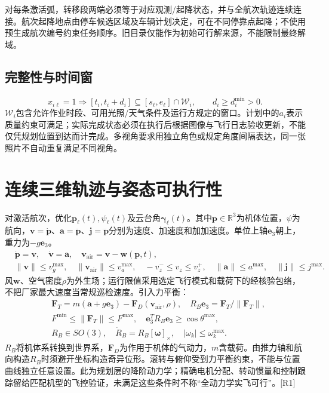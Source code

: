 \noindent 对每条激活弧，转移段两端必须等于对应观测/起降状态，并与全航次轨迹连续连接。航次起降地点由停车候选区域及车辆计划决定，可在不同停靠点起降；不使用预生成航次编号约束任务顺序。旧目录仅能作为初始可行解来源，不能限制最终解域。

\subsection{完整性与时间窗}
\begin{equation}
 x_{i\ell}=1\Rightarrow
 [t_i,t_i+d_i]\subseteq[s_\ell,e_\ell]\cap\mathcal W_i,
 \qquad d_i\ge d_i^{\min}>0.\label{eng:eq:window}
\end{equation}
\noindent $\mathcal W_i$包含允许作业时段、可用光照/天气条件及运行方规定的窗口。计划中的$a_i$表示质量约束可满足；实际完成状态必须在执行后根据图像与飞行日志验收更新，不能仅凭规划位置到达而计完成。多视角要求用独立角色或规定角度间隔表达，同一张照片不自动重复满足不同视角。
\clearpage

\section{连续三维轨迹与姿态可执行性}
\noindent 对激活航次，优化$\mathbf p_\ell(t),\psi_\ell(t)$及云台角$\boldsymbol\gamma_\ell(t)$。其中$\mathbf p\in\mathbb R^3$为机体位置，$\psi$为航向，$\mathbf v=\dot{\mathbf p}$、$\mathbf a=\ddot{\mathbf p}$、$\mathbf j=\dddot{\mathbf p}$分别为速度、加速度和加加速度。单位上轴$\mathbf e_3$朝上，重力为$-g\mathbf e_3$。
\begin{align}
 &\dot{\mathbf p}=\mathbf v,\quad \dot{\mathbf v}=\mathbf a,\quad
 \mathbf v_{\mathrm{air}}=\mathbf v-\mathbf w(\mathbf p,t),\\
 &\|\mathbf v\|\le v_g^{\max},\quad\|\mathbf v_{\mathrm{air}}\|\le v_a^{\max},\quad
 -v_z^-\le v_z\le v_z^+,\quad
 \|\mathbf a\|\le a^{\max},\quad\|\mathbf j\|\le j^{\max}.\label{eng:eq:kinematic}
\end{align}
\noindent 风$\mathbf w$、空气密度$\rho$为外生场；运行限值采用选定飞行模式和载荷下的经核验包络，不把厂家最大速度当常规巡检速度。引入力平衡：
\begin{align}
 &\mathbf F_T=m(\mathbf a+g\mathbf e_3)-\mathbf F_D(\mathbf v_{\mathrm{air}},\rho),
 \quad R_B\mathbf e_3=\mathbf F_T/\|\mathbf F_T\|,\\
 &F^{\min}\le\|\mathbf F_T\|\le F^{\max},\quad
 \mathbf e_3^TR_B\mathbf e_3\ge\cos\theta^{\max},\\
 &R_B\in SO(3),\quad \dot R_B=R_B[\boldsymbol\omega]_\times,
 \quad |\omega_k|\le\omega_k^{\max}.\label{eng:eq:attitude}
\end{align}
\noindent $R_B$将机体系转换到世界系，$\mathbf F_D$为作用于机体的气动力，$m$含载荷。由推力轴和航向构造$R_B$时须避开坐标构造奇异位形。滚转与俯仰受到力平衡约束，不能与位置曲线独立任意设置。此为规划层的降阶动力学；精确电机分配、转动惯量和控制跟踪留给匹配机型的飞控验证，未满足这些条件时不称“全动力学实飞可行”。[R1]

